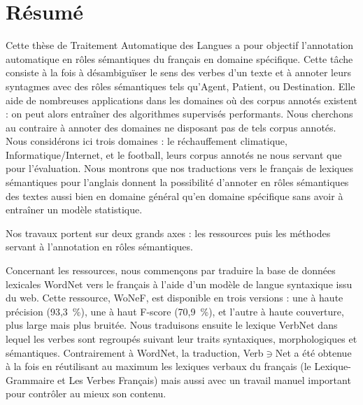 \documentclass[oneside,parskip]{scrbook}
\date{\Large
    \begin{minipage}[t]{0.61\linewidth}
    \begin{center}\textbf{Thèse sous la direction de :}\end{center}
    Laurence \textsc{Danlos} et Gaël \textsc{de Chalendar}
    \begin{center}~\end{center}
    \begin{center}~\end{center}
    \end{minipage}
}
\title{}
\newcommand{\verbenet}{Verb$\ni$Net}
\begin{document}
\maketitle

\frontmatter



\chapter{Résumé}

Cette thèse de Traitement Automatique des Langues a pour objectif l'annotation
automatique en rôles sémantiques du français en domaine spécifique. Cette tâche
consiste à la fois à désambiguïser le sens des verbes d'un texte et à annoter
leurs syntagmes avec des rôles sémantiques tels qu'Agent, Patient, ou
Destination. Elle aide de nombreuses applications dans les domaines où des
corpus annotés existent : on peut alors entraîner des algorithmes supervisés
performants. Nous cherchons au contraire à annoter des domaines ne disposant
pas de tels corpus annotés. Nous considérons ici trois domaines : le
réchauffement climatique, Informatique/Internet, et le football, leurs corpus
annotés ne nous servant que pour l'évaluation. Nous montrons que nos
traductions vers le français de lexiques sémantiques pour l'anglais donnent la
possibilité d'annoter en rôles sémantiques des textes aussi bien en domaine
général qu'en domaine spécifique sans avoir à entraîner un modèle statistique.

Nos travaux portent sur deux grands axes : les ressources puis les méthodes servant à
l'annotation en rôles sémantiques.

Concernant les ressources, nous commençons par traduire la base de données
lexicales WordNet vers le français à l'aide d'un modèle de langue syntaxique
issu du web.  Cette ressource, WoNeF, est disponible en trois versions : une à
haute précision (93,3~\%), une à haut F-score (70,9~\%), et l'autre à haute
couverture, plus large mais plus bruitée. Nous traduisons ensuite le lexique
VerbNet dans lequel les verbes sont regroupés suivant leur traits syntaxiques,
morphologiques et sémantiques. Contrairement à WordNet, la traduction,
\verbenet{} a été obtenue à la fois en réutilisant au maximum les lexiques
verbaux du français (le Lexique-Grammaire et Les Verbes Français) mais aussi
avec un travail manuel important pour contrôler au mieux son contenu.
\end{document}
